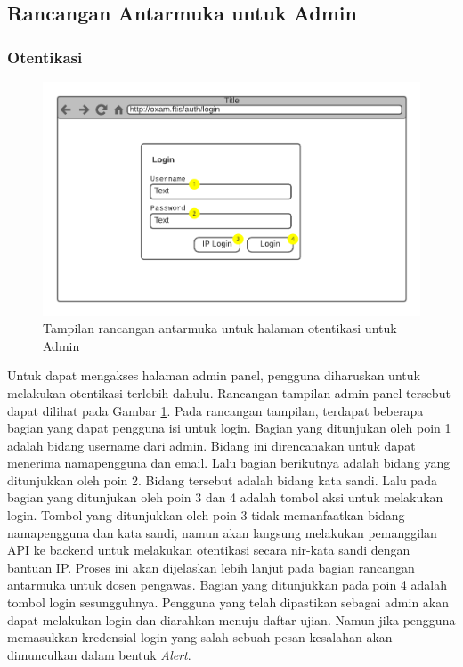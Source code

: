 \subsection{Rancangan Antarmuka untuk Admin}
    
\subsubsection{Otentikasi}
    \begin{figure}
        \centering
        \includegraphics[width=0.7\paperwidth]{Gambar/mockups/Mockup--Admin - Login.pdf}
        \caption{Tampilan rancangan antarmuka untuk halaman otentikasi untuk Admin}
        \label{fig:mockup_admin_login}
    \end{figure}
    Untuk dapat mengakses halaman admin panel, pengguna diharuskan untuk melakukan otentikasi
    terlebih dahulu. Rancangan tampilan admin panel tersebut dapat dilihat pada Gambar 
    \ref{fig:mockup_admin_login}. Pada rancangan tampilan, terdapat beberapa bagian yang dapat
    pengguna isi untuk login. Bagian yang ditunjukan oleh poin 1 adalah bidang username dari
    admin. Bidang ini direncanakan untuk dapat menerima namapengguna dan email. Lalu bagian
    berikutnya adalah bidang yang ditunjukkan oleh poin 2. Bidang tersebut adalah bidang kata sandi.
    Lalu pada bagian yang ditunjukan oleh poin 3 dan 4 adalah tombol aksi untuk melakukan login.
    Tombol yang ditunjukkan oleh poin 3 tidak memanfaatkan bidang namapengguna dan kata sandi,
    namun akan langsung melakukan pemanggilan API ke backend untuk melakukan otentikasi
    secara nir-kata sandi dengan bantuan IP. Proses ini akan dijelaskan lebih lanjut pada bagian
    rancangan antarmuka untuk dosen pengawas. Bagian yang ditunjukkan pada poin 4 adalah tombol
    login sesungguhnya. Pengguna yang telah dipastikan sebagai admin akan dapat melakukan login
    dan diarahkan menuju daftar ujian. Namun jika pengguna memasukkan kredensial login yang salah
    sebuah pesan kesalahan akan dimunculkan dalam bentuk \textit{Alert}.
    

